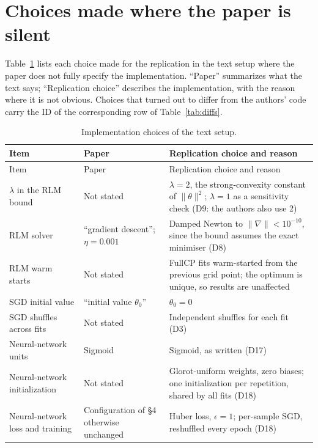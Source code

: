 \appendix

\section{Choices made where the paper is silent}
\label{app:assumptions}

Table~\ref{tab:assumptions} lists each choice made for the replication in the text setup where the paper does not fully specify the
implementation. ``Paper'' summarizes what the text says; ``Replication choice'' describes the implementation, with the reason where
it is not obvious. Choices that turned out to differ from the authors' code carry the ID of the corresponding row of
Table~\ref{tab:diffs}.

{\scriptsize
\begin{longtable}{@{}>{\raggedright\arraybackslash}p{2.8cm} >{\raggedright\arraybackslash}p{3.4cm} >{\raggedright\arraybackslash}p{6.4cm}@{}}
\caption{Implementation choices of the text setup.}\label{tab:assumptions}\\
\toprule
Item & Paper & Replication choice and reason \\
\midrule
\endfirsthead
\toprule
Item & Paper & Replication choice and reason \\
\midrule
\endhead
\bottomrule
\endfoot
$\lambda$ in the RLM bound & Not stated & $\lambda=2$, the strong-convexity constant of $\|\theta\|^2$; $\lambda=1$ as a
  sensitivity check (D9: the authors also use 2) \\
RLM solver & ``gradient descent''; $\eta=0.001$ & Damped Newton to $\|\nabla\|<10^{-10}$, since the bound
  assumes the exact minimiser (D8) \\
RLM warm starts & Not stated & FullCP fits warm-started from the previous grid point; the optimum is unique, so
  results are unaffected \\
SGD initial value & ``initial value $\theta_0$'' & $\theta_0=0$ \\
SGD shuffles across fits & Not stated & Independent shuffles for each fit (D3) \\
Neural-network units & Sigmoid & Sigmoid, as written (D17) \\
Neural-network initialization & Not stated & Glorot-uniform weights, zero biases; one initialization per repetition,
  shared by all fits (D18) \\
Neural-network loss and training & Configuration of §4 otherwise unchanged & Huber loss, $\epsilon=1$; per-sample SGD,
  reshuffled every epoch (D18) \\

\end{longtable}}
